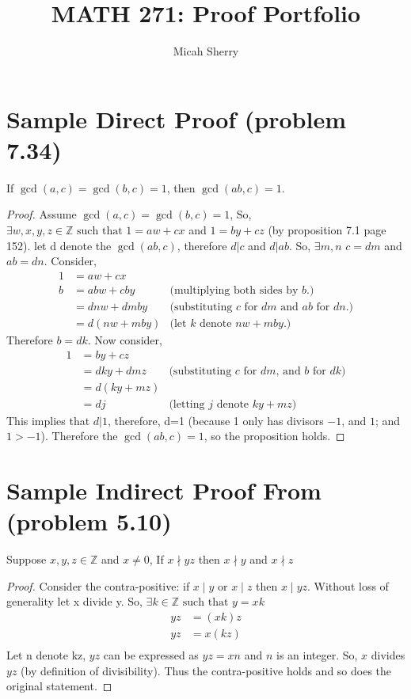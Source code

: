 \documentclass{article}
\title{MATH 271: Proof Portfolio}
\author{Micah Sherry}
\newcommand{\Z}{\mathbb{Z}}
\newcommand{\st}{\text{ such that }}
\begin{document}
	\maketitle
	\section*{Sample Direct Proof (problem 7.34)}
	If $\gcd(a,c)= \gcd(b,c)=1$, then $\gcd(ab,c)=1$.
	\begin{proof}
		Assume $\gcd(a,c)= \gcd(b,c)=1$, So, $\exists w, x, y, z  \in \Z \st 1= aw+ cx$ and $1= by + cz$ (by proposition 7.1 page 152).
		let d denote the $\gcd(ab,c)$, therefore $d|c$ and $d| ab$. So, $\exists m,n$ \st $c=dm$ and $ab =dn$. 
		Consider, 
		\begin{align*}
			1 &= aw+cx\\
			b &= abw+cby 	& \text{(multiplying both sides by $b$.)}\\
			&= dnw+dmby 	& \text{(substituting $c$ for $dm$ and $ab$ for $dn$.)}\\
			&= d(nw+mby) 	& \text{(let $k$ denote $nw+mby$.)}
		\end{align*}
		Therefore $b = dk$. Now consider,
		\begin{align*}
			1 &= by + cz \\
			&= dky+ dmz & \text{(substituting $c$ for $dm$, and $b$ for $dk$)}\\
			&= d(ky+mz) \\				  
			&= dj 	  & \text{(letting $j$ denote $ky+mz$)}
		\end{align*}
		This implies that $d|1$, therefore, d=1 (because 1 only has divisors $-1$, and $1$; and $1 > -1$). Therefore the $\gcd(ab,c)=1$, so the proposition holds.
	\end{proof}
	
	\section*{Sample Indirect Proof From (problem 5.10)}
	Suppose $x, y, z \in \Z$ and $ x \neq 0$, If $x \nmid yz $ then $ x \nmid y $ and $ x \nmid z $ 
	\begin{proof}
		Consider the contra-positive: if $x \mid y$  or  $x \mid z$ then  $x \mid yz $. Without loss of generality let x divide y. 
		So, $ \exists k \in \Z \st y = xk $ 
		\begin{align*}
		yz &= (xk)z\\
		yz &= x(kz)\\
		\end{align*}
		Let n denote kz, $yz$ can be expressed as $yz = xn$ and $n$ is an integer. So, $x$ divides $yz$ (by definition of divisibility). Thus the contra-positive holds and so does the original statement.
		
	\end{proof}
	
\end{document}
